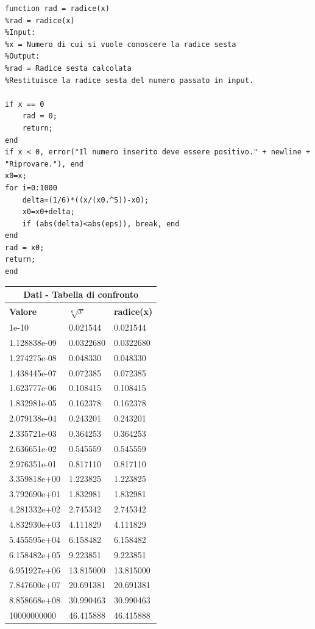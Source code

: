 \documentclass[10pt,a4paper]{article}
\begin{document}
\begin{lstlisting}[style=Matlab-editor]
function rad = radice(x)
%rad = radice(x)
%Input: 
%x = Numero di cui si vuole conoscere la radice sesta
%Output:
%rad = Radice sesta calcolata
%Restituisce la radice sesta del numero passato in input.
  
if x == 0
    rad = 0;
    return;
end
if x < 0, error("Il numero inserito deve essere positivo." + newline + "Riprovare."), end
x0=x;
for i=0:1000
    delta=(1/6)*((x/(x0.^5))-x0);
    x0=x0+delta;
    if (abs(delta)<abs(eps)), break, end 
end
rad = x0;
return;
end
\end{lstlisting}
\begin{center}
  \begin{tabular}{ |p{2.7cm}|p{2.7cm}|p{2.7cm}| }
    \hline
    \multicolumn{3}{|c|}{ \textbf{Dati - Tabella di confronto}} \\
    \hline
    \textbf{Valore} & $ \sqrt[6]{x} $ & \textbf{radice(x)}      \\
    \hline
    1e-10           & 0.021544        & 0.021544                \\
    1.128838e-09    & 0.0322680       & 0.0322680               \\
    1.274275e-08    & 0.048330        & 0.048330                \\
    1.438445e-07    & 0.072385        & 0.072385                \\
    1.623777e-06    & 0.108415        & 0.108415                \\
    1.832981e-05    & 0.162378        & 0.162378                \\
    2.079138e-04    & 0.243201        & 0.243201                \\
    2.335721e-03    & 0.364253        & 0.364253                \\
    2.636651e-02    & 0.545559        & 0.545559                \\
    2.976351e-01    & 0.817110        & 0.817110                \\
    3.359818e+00    & 1.223825        & 1.223825                \\
    3.792690e+01    & 1.832981        & 1.832981                \\
    4.281332e+02    & 2.745342        & 2.745342                \\
    4.832930e+03    & 4.111829        & 4.111829                \\
    5.455595e+04    & 6.158482        & 6.158482                \\
    6.158482e+05    & 9.223851        & 9.223851                \\
    6.951927e+06    & 13.815000       & 13.815000               \\
    7.847600e+07    & 20.691381       & 20.691381               \\
    8.858668e+08    & 30.990463       & 30.990463               \\
    10000000000     & 46.415888       & 46.415888               \\
    \hline
  \end{tabular}
\end{center}
\end{document}

